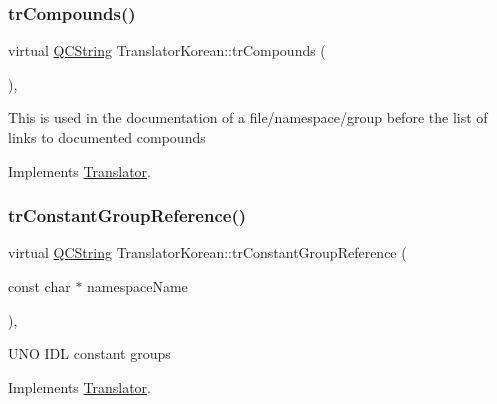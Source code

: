\mbox{\label{class_translator_korean_a16909409dbd4cb56727c3667cd98f76e}} 
\subsubsection{\texorpdfstring{trCompounds()}{trCompounds()}}
{\footnotesize\ttfamily virtual \mbox{\hyperlink{class_q_c_string}{Q\+C\+String}} Translator\+Korean\+::tr\+Compounds (\begin{DoxyParamCaption}{ }\end{DoxyParamCaption})\hspace{0.3cm}{\ttfamily [inline]}, {\ttfamily [virtual]}}

This is used in the documentation of a file/namespace/group before the list of links to documented compounds 

Implements \mbox{\hyperlink{class_translator}{Translator}}.

\mbox{\label{class_translator_korean_ac4d4f3c2f52af47529424f97a923e670}} 
\subsubsection{\texorpdfstring{trConstantGroupReference()}{trConstantGroupReference()}}
{\footnotesize\ttfamily virtual \mbox{\hyperlink{class_q_c_string}{Q\+C\+String}} Translator\+Korean\+::tr\+Constant\+Group\+Reference (\begin{DoxyParamCaption}\item[{const char $\ast$}]{namespace\+Name }\end{DoxyParamCaption})\hspace{0.3cm}{\ttfamily [inline]}, {\ttfamily [virtual]}}

U\+NO I\+DL constant groups 

Implements \mbox{\hyperlink{class_translator}{Translator}}.

\mbox{\label{class_translator_korean_a08d1ba766aaae7466eb378aeb6b0c25b}} 
